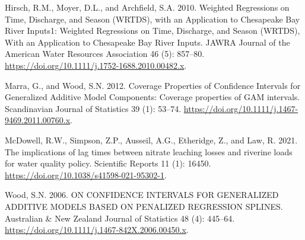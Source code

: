 \documentclass[
]{article}
\newlength{\cslhangindent}
\newlength{\cslentryspacingunit} %
\newenvironment{CSLReferences}[2] %
 {%
  \setlength{\parindent}{0pt}
  \ifodd #1
  \let\oldpar\par
  \def\par{\hangindent=\cslhangindent\oldpar}
  \fi
  \setlength{\parskip}{#2\cslentryspacingunit}
 }%
 {}
\begin{document}
\hypertarget{refs}{}
\begin{CSLReferences}{1}{0}
\leavevmode{}%
Hirsch, R.M., Moyer, D.L., and Archfield, S.A. 2010. Weighted
Regressions on Time, Discharge, and Season (WRTDS), with an Application
to Chesapeake Bay River Inputs1: Weighted Regressions on Time,
Discharge, and Season (WRTDS), With an Application to Chesapeake Bay
River Inputs. JAWRA Journal of the American Water Resources Association
46 (5): 857--80. \url{https://doi.org/10.1111/j.1752-1688.2010.00482.x}.

\leavevmode{}%
Marra, G., and Wood, S.N. 2012. Coverage Properties of Confidence
Intervals for Generalized Additive Model Components: Coverage properties
of GAM intervals. Scandinavian Journal of Statistics 39 (1): 53--74.
\url{https://doi.org/10.1111/j.1467-9469.2011.00760.x}.

\leavevmode{}%
McDowell, R.W., Simpson, Z.P., Ausseil, A.G., Etheridge, Z., and Law, R.
2021. The implications of lag times between nitrate leaching losses and
riverine loads for water quality policy. Scientific Reports 11 (1):
16450. \url{https://doi.org/10.1038/s41598-021-95302-1}.

\leavevmode{}%
Wood, S.N. 2006. ON CONFIDENCE INTERVALS FOR GENERALIZED ADDITIVE MODELS
BASED ON PENALIZED REGRESSION SPLINES. Australian \& New Zealand Journal
of Statistics 48 (4): 445--64.
\url{https://doi.org/10.1111/j.1467-842X.2006.00450.x}.

\end{CSLReferences}
\end{document}
